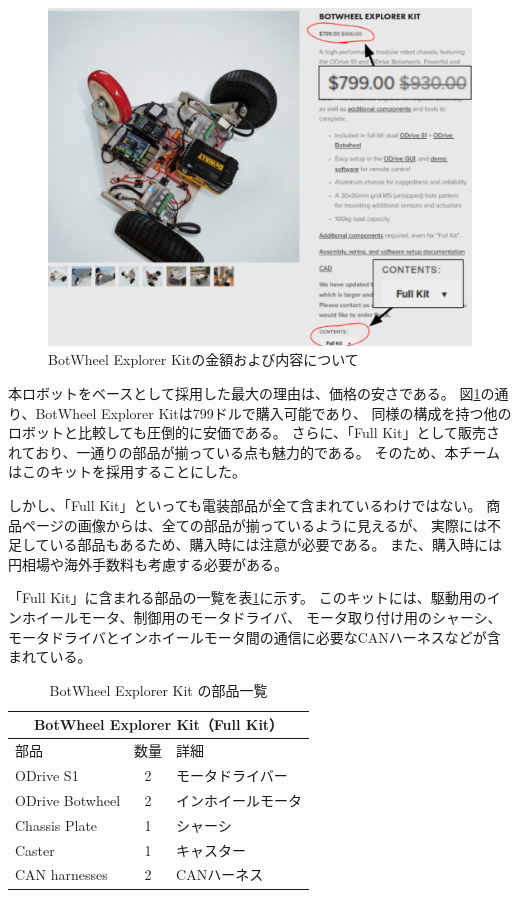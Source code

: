 \documentclass[twocolumn,9pt]{jsproceedings}
\begin{document}
\begin{figure}[h]
  \begin{center}
    \includegraphics[width=0.8\linewidth]{figs/b_kit_price.pdf}
    \caption{BotWheel Explorer Kitの金額および内容について}
    \label{fig:b_robot_price}
  \end{center}
\end{figure}

本ロボットをベースとして採用した最大の理由は、価格の安さである。
図\ref{fig:b_robot_price}の通り、BotWheel Explorer Kitは799ドルで購入可能であり、
同様の構成を持つ他のロボットと比較しても圧倒的に安価である。
さらに、「Full Kit」として販売されており、一通りの部品が揃っている点も魅力的である。
そのため、本チームはこのキットを採用することにした。

しかし、「Full Kit」といっても電装部品が全て含まれているわけではない。
商品ページの画像からは、全ての部品が揃っているように見えるが、
実際には不足している部品もあるため、購入時には注意が必要である。
また、購入時には円相場や海外手数料も考慮する必要がある。

「Full Kit」に含まれる部品の一覧を表\ref{tab:botwheel_kit}に示す。
このキットには、駆動用のインホイールモータ、制御用のモータドライバ、
モータ取り付け用のシャーシ、モータドライバとインホイールモータ間の通信に必要なCANハーネスなどが含まれている。
\begin{table}[h]
  \centering
  \caption{BotWheel Explorer Kit の部品一覧}
  \begin{tabular}{|l|c|l|}
      \hline
      \multicolumn{3}{|c|}{\textbf{BotWheel Explorer Kit（Full Kit）}} \\
      \hline
      部品 & 数量 & 詳細 \\
      \hline
      ODrive S1 & 2 & モータドライバー \\
      ODrive Botwheel & 2 & インホイールモータ \\
      Chassis Plate & 1 & シャーシ \\
      Caster & 1 & キャスター \\
      CAN harnesses & 2 & CANハーネス \\
      \hline
  \end{tabular}
  \label{tab:botwheel_kit}
\end{table}
\end{document}
